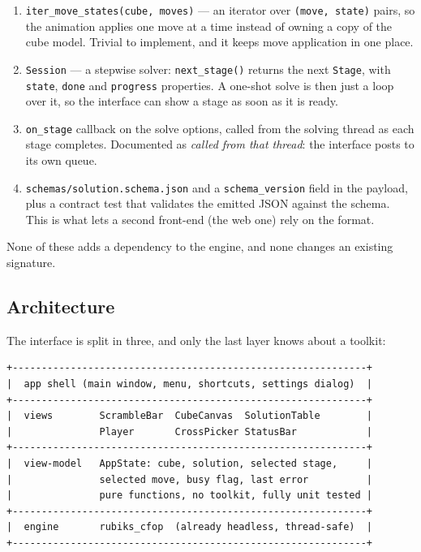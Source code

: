 \begin{enumerate}[leftmargin=1.4em]
  \item \texttt{iter\_move\_states(cube, moves)} --- an iterator over
  \texttt{(move, state)} pairs, so the animation applies one move at a time instead
  of owning a copy of the cube model.  Trivial to implement, and it keeps move
  application in one place.
  \item \texttt{Session} --- a stepwise solver: \texttt{next\_stage()} returns the
  next \texttt{Stage}, with \texttt{state}, \texttt{done} and \texttt{progress}
  properties.  A one-shot solve is then just a loop over it, so the interface can
  show a stage as soon as it is ready.
  \item \texttt{on\_stage} callback on the solve options, called from the solving
  thread as each stage completes.  Documented as \emph{called from that thread}:
  the interface posts to its own queue.
  \item \texttt{schemas/solution.schema.json} and a \texttt{schema\_version} field in
  the payload, plus a contract test that validates the emitted JSON against the
  schema.  This is what lets a second front-end (the web one) rely on the format.
\end{enumerate}

None of these adds a dependency to the engine, and none changes an existing
signature.

\subsection{Architecture}

The interface is split in three, and only the last layer knows about a toolkit:

\begin{lstlisting}[style=data]
+-------------------------------------------------------------+
|  app shell (main window, menu, shortcuts, settings dialog)  |
+-------------------------------------------------------------+
|  views        ScrambleBar  CubeCanvas  SolutionTable        |
|               Player       CrossPicker StatusBar            |
+-------------------------------------------------------------+
|  view-model   AppState: cube, solution, selected stage,     |
|               selected move, busy flag, last error          |
|               pure functions, no toolkit, fully unit tested |
+-------------------------------------------------------------+
|  engine       rubiks_cfop  (already headless, thread-safe)  |
+-------------------------------------------------------------+
\end{lstlisting}


